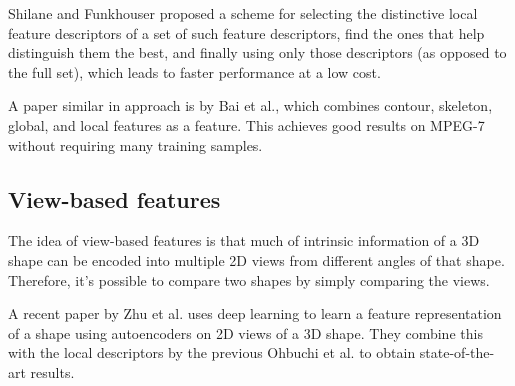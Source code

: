 \documentclass[../tech_report_1.tex]{subfiles}
\begin{document}
Shilane and Funkhouser\cite{shilane2006selecting} proposed a scheme for selecting the distinctive local feature descriptors of a set of such feature descriptors, find the ones that help distinguish them the best, and finally using only those descriptors (as opposed to the full set), which leads to faster performance at a low cost.

A paper similar in approach is by Bai et al.\cite{bai2009integrating}, which combines contour, skeleton, global, and local features as a feature. This achieves good results on MPEG-7 without requiring many training samples.

\subsection{View-based features}

The idea of view-based features is that much of intrinsic information of a 3D shape can be encoded into multiple 2D views from different angles of that shape. Therefore, it's possible to compare two shapes by simply comparing the views.

A recent paper by Zhu et al.\cite{zhu2016deep} uses deep learning to learn a feature representation of a shape using autoencoders on 2D views of a 3D shape. They combine this with the local descriptors by the previous Ohbuchi et al.\cite{ohbuchi2008salient} to obtain state-of-the-art results. 
\end{document}
